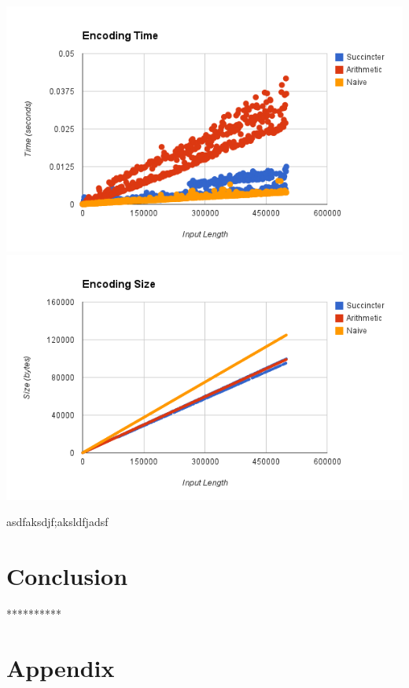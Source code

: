 \documentclass{article}
\begin{document}
\includegraphics[scale=0.4]{images/encoding_time}
\includegraphics[scale=0.4]{images/encoding_size}
\afterpage{\vfill}

asdfaksdjf;aksldfjadsf\\


\noindent \section{Conclusion}

\bigskip
\centerline{**********}


\noindent \section*{Appendix}

%

%

\end{document}
